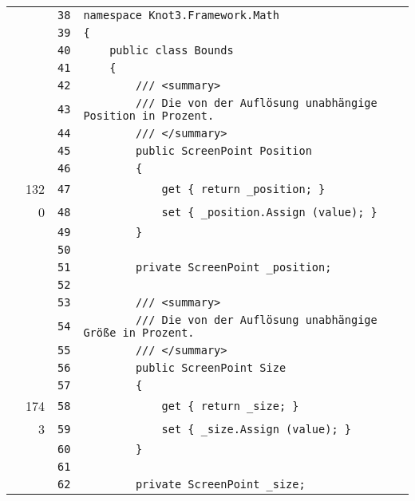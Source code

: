 \documentclass[a4paper,10pt]{article}
\begin{document}
\begin{longtable}[l]{lrrl}
\cellcolor{gray} &  & \verb~38~ & \verb~namespace Knot3.Framework.Math~\\
\cellcolor{gray} &  & \verb~39~ & \verb~{~\\
\cellcolor{gray} &  & \verb~40~ & \verb~    public class Bounds~\\
\cellcolor{gray} &  & \verb~41~ & \verb~    {~\\
\cellcolor{gray} &  & \verb~42~ & \verb~        /// <summary>~\\
\cellcolor{gray} &  & \verb~43~ & \verb~        /// Die von der Auflösung unabhängige Position in Prozent.~\\
\cellcolor{gray} &  & \verb~44~ & \verb~        /// </summary>~\\
\cellcolor{gray} &  & \verb~45~ & \verb~        public ScreenPoint Position~\\
\cellcolor{gray} &  & \verb~46~ & \verb~        {~\\
\cellcolor{green} & 132 & \verb~47~ & \verb~            get { return _position; }~\\
\cellcolor{red} & 0 & \verb~48~ & \verb~            set { _position.Assign (value); }~\\
\cellcolor{gray} &  & \verb~49~ & \verb~        }~\\
\cellcolor{gray} &  & \verb~50~ & \verb~~\\
\cellcolor{gray} &  & \verb~51~ & \verb~        private ScreenPoint _position;~\\
\cellcolor{gray} &  & \verb~52~ & \verb~~\\
\cellcolor{gray} &  & \verb~53~ & \verb~        /// <summary>~\\
\cellcolor{gray} &  & \verb~54~ & \verb~        /// Die von der Auflösung unabhängige Größe in Prozent.~\\
\cellcolor{gray} &  & \verb~55~ & \verb~        /// </summary>~\\
\cellcolor{gray} &  & \verb~56~ & \verb~        public ScreenPoint Size~\\
\cellcolor{gray} &  & \verb~57~ & \verb~        {~\\
\cellcolor{green} & 174 & \verb~58~ & \verb~            get { return _size; }~\\
\cellcolor{green} & 3 & \verb~59~ & \verb~            set { _size.Assign (value); }~\\
\cellcolor{gray} &  & \verb~60~ & \verb~        }~\\
\cellcolor{gray} &  & \verb~61~ & \verb~~\\
\cellcolor{gray} &  & \verb~62~ & \verb~        private ScreenPoint _size;~\\

\end{longtable}
\end{document}

